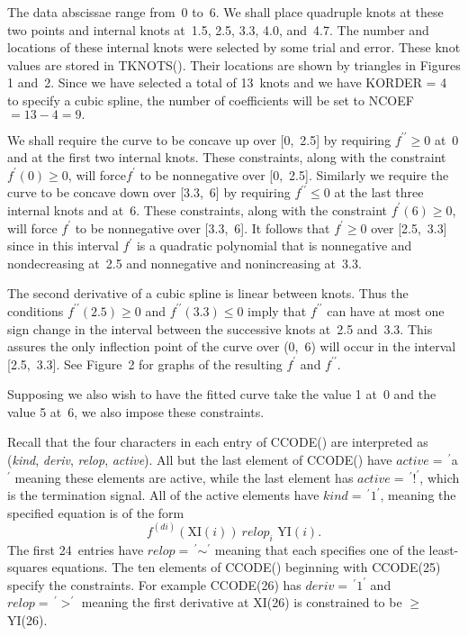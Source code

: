 \documentclass[twoside]{MATH77}
\begin{document}
The data abscissae range from~0 to~6. We shall place quadruple knots at these
two points and internal knots at~1.5, 2.5, 3.3, 4.0, and~4.7. The number and
locations of these internal knots were selected by some trial and error.
These knot values are stored in TKNOTS(). Their locations are shown by
triangles in Figures 1 and~2. Since we have selected a total of 13~knots and
we have KORDER = 4 to specify a cubic spline, the number of coefficients
will be set to NCOEF $= 13 - 4 = 9.$

We shall require the curve to be concave up over [0,~2.5] by requiring $%
f^{\prime \prime} \geq 0$ at~0 and at the first two internal knots. These
constraints, along with the constraint $f^{\prime}(0) \geq 0$, will force$%
f^{\prime}$ to be nonnegative over [0,~2.5]. Similarly we require the curve
to be concave down over [3.3,~6] by requiring $f^{\prime \prime} \leq 0$ at
the last three internal knots and at~6. These constraints, along with the
constraint $f^{\prime}(6) \geq 0$, will force $f^{\prime}$ to be nonnegative
over [3.3,~6]. It follows that $f^{\prime}\geq 0$ over [2.5,~3.3] since in
this interval $f^{\prime}$ is a quadratic polynomial that is nonnegative and
nondecreasing at~2.5 and nonnegative and nonincreasing at~3.3.

The second derivative of a cubic spline is linear between knots. Thus
the conditions $f^{\prime \prime}(2.5) \geq 0$ and $f^{\prime \prime}(3.3)
\leq 0$ imply that $f^{\prime \prime}$ can have at most one sign change in the
interval between the successive knots at~2.5 and~3.3.
This assures the only inflection point of the curve over (0,~6) will occur
in the interval [2.5,~3.3]. See Figure~2 for graphs of the
resulting $f^{\prime}$ and $f^{\prime \prime}.$

Supposing we also wish to have the fitted curve take the value 1 at~0 and
the value 5 at~6, we also impose these constraints.

Recall that the four characters in each entry of CCODE() are interpreted as
({\em kind}, {\em deriv}, {\em relop}, {\em active}). All but the last element of CCODE()
have $active =\,^{\prime}$a$^{\prime}$ meaning these elements are active, while
the last element has $active =\,^{\prime}!^{\prime}$, which is the termination
signal. All of the active elements have $kind =\,^{\prime}1^{\prime}$,
meaning the specified equation is of the form
\begin{equation*}
f^{(di)}(\text{XI}(i))\ relop_i \text{ YI}(i).
\end{equation*}
The first 24~entries have $relop =\,^{\prime}{\sim }^{\prime}$ meaning that
each specifies one of the least-squares equations. The ten elements of CCODE()
beginning with CCODE(25) specify the constraints. For example CCODE(26) has $%
deriv =\,^{\prime}1^{\prime}$ and $relop =\,^{\prime}{>}^{\prime}$ meaning the
first derivative at XI(26) is constrained to be $\geq $ YI(26).
\vspace{10pt}
\end{document}
